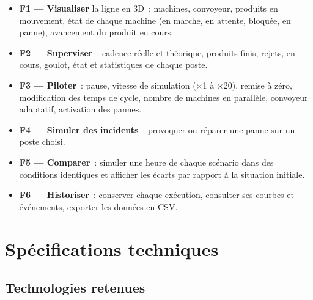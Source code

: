 \begin{itemize}
  \item \textbf{F1 --- Visualiser} la ligne en \ac{3D}~: machines, convoyeur, produits en mouvement, état de chaque machine (en marche, en attente, bloquée, en panne), avancement du produit en cours.
  \item \textbf{F2 --- Superviser}~: cadence réelle et théorique, produits finis, rejets, en-cours, goulot, état et statistiques de chaque poste.
  \item \textbf{F3 --- Piloter}~: pause, vitesse de simulation ($\times$1 à $\times$20), remise à zéro, modification des temps de cycle, nombre de machines en parallèle, convoyeur adaptatif, activation des pannes.
  \item \textbf{F4 --- Simuler des incidents}~: provoquer ou réparer une panne sur un poste choisi.
  \item \textbf{F5 --- Comparer}~: simuler une heure de chaque scénario dans des conditions identiques et afficher les écarts par rapport à la situation initiale.
  \item \textbf{F6 --- Historiser}~: conserver chaque exécution, consulter ses courbes et événements, exporter les données en \ac{CSV}.
\end{itemize}

\section{Spécifications techniques}

\subsection{Technologies retenues}

